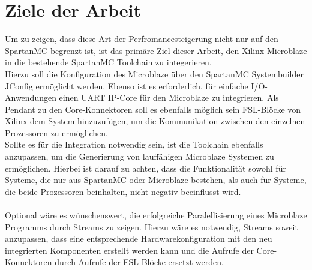 \section{Ziele der Arbeit}
Um zu zeigen, dass diese Art der Perfromancesteigerung nicht nur auf den SpartanMC begrenzt ist, ist das primäre Ziel dieser Arbeit, den Xilinx Microblaze 
in die bestehende SpartanMC Toolchain zu integerieren.\\
Hierzu soll die Konfiguration des Microblaze über den SpartanMC Systembuilder JConfig ermöglicht werden. Ebenso ist es erforderlich, für einfache
I/O-Anwendungen einen UART IP-Core für den Microblaze zu integrieren. Als Pendant zu den Core-Konnektoren soll es ebenfalls möglich sein FSL-Blöcke von Xilinx
dem System hinzuzufügen, um die Kommunikation zwischen den einzelnen Prozessoren zu ermöglichen.\\
Sollte es für die Integration notwendig sein, ist die Toolchain ebenfalls anzupassen, um die Generierung von lauffähigen Microblaze Systemen zu ermöglichen.
Hierbei ist darauf zu achten, dass die Funktionalität sowohl für Systeme, die nur aus SpartanMC oder Microblaze bestehen, als auch für Systeme, die beide Prozessoren beinhalten, 
nicht negativ beeinflusst wird.\\\\
Optional wäre es wünschenswert, die erfolgreiche Paralellisierung eines Microblaze Programms durch \textmu\/Streams zu zeigen. Hierzu wäre es notwendig, 
\textmu\/Streams soweit anzupassen, dass eine entsprechende Hardwarekonfiguration mit den neu integrierten Komponenten erstellt werden kann und
die Aufrufe der Core-Konnektoren durch Aufrufe der FSL-Blöcke ersetzt werden.
